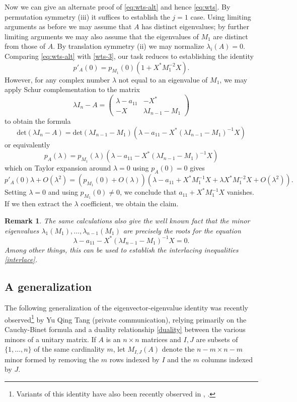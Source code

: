 \documentclass[12pt]{amsart}
\newtheorem{remark}[lemma]{Remark}
\begin{document}
Now we can give an alternate proof of \eqref{eq:wts-alt} and hence \eqref{eq:wts}.  By permutation symmetry (iii) it suffices to establish the $j=1$ case.  Using limiting arguments as before we may assume that $A$ has distinct eigenvalues; by further limiting arguments we may also assume that the eigenvalues of $M_1$ are distinct from those of $A$.  By translation symmetry (ii) we may normalize $\lambda_i(A) = 0$.  Comparing \eqref{eq:wts-alt} with \eqref{wts-3}, our task reduces to establishing the identity
$$ p'_A(0)  = p_{M_1}(0) (1 + X^* M_1^{-2} X).$$
However, for any complex number $\lambda$ not equal to an eigenvalue of $M_1$, we may apply Schur complementation \cite{cottle} to the matrix
$$ \lambda I_n - A = \begin{pmatrix} \lambda - a_{11} & -X^* \\ -X & \lambda I_{n-1} - M_1 \end{pmatrix} $$
to obtain the formula
$$ \mathrm{det}( \lambda I_n - A ) = \mathrm{det}( \lambda I_{n-1} - M_1 ) (\lambda - a_{11} - X^* (\lambda I_{n-1} - M_1)^{-1} X )$$
or equivalently
$$ p_A(\lambda) = p_{M_1}(\lambda) (\lambda - a_{11} - X^* (\lambda I_{n-1} - M_1)^{-1} X )$$
which on Taylor expansion around $\lambda=0$ using $p_A(0)=0$ gives
$$ p'_A(0) \lambda + O(\lambda^2) = (p_{M_1}(0) + O(\lambda)) ( \lambda - a_{11} + X^* M_1^{-1} X + \lambda X^* M_1^{-2} X + O(\lambda^2)).$$
Setting $\lambda=0$ and using $p_{M_1}(0) \neq 0$, we conclude that $a_{11} + X^* M_1^{-1} X$ vanishes.  If we then extract the $\lambda$ coefficient, we obtain the claim.

\begin{remark}  The same calculations also give the well known fact that the minor eigenvalues $\lambda_1(M_1),\dots,\lambda_{n-1}(M_1)$ are precisely the roots for the equation
$$ \lambda - a_{11} - X^* (\lambda I_{n-1} - M_1)^{-1} X = 0.$$
Among other things, this can be used to establish the interlacing inequalities \eqref{interlace}.
\end{remark}

\subsection{A generalization}

The following generalization of the eigenvector-eigenvalue identity was recently observed\footnote{Variants of this identity have also been recently observed in \cite{chen}, \cite{stawiska}.} by Yu Qing Tang (private communication), relying primarily on the Cauchy-Binet formula and a duality relationship \eqref{duality} between the various minors of a unitary matrix.  If $A$ is an $n \times n$ matrices and $I,J$ are subsets of $\{1,\dots,n\}$ of the same cardinality $m$, let $M_{I,J}(A)$ denote the $n-m \times n-m$ minor formed by removing the $m$ rows indexed by $I$ and the $m$ columns indexed by $J$.
\end{document}
